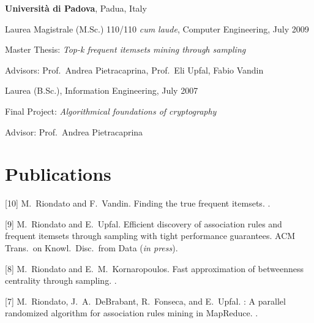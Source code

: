 \documentclass[margin,line]{resume}
\begin{document}
\begin{resume}
{\bf Universit\`a di Padova}, Padua, Italy\\
\vspace*{-.18in}
\begin{list1}
\item[] Laurea Magistrale (M.Sc.) 110/110 \textit{cum laude}, Computer Engineering, July 2009
\begin{list2}
\item Master Thesis: {\em Top-k frequent itemsets mining through sampling}
\item Advisors: Prof.~Andrea Pietracaprina, Prof.~Eli Upfal, Fabio Vandin
\end{list2}
\item[] Laurea (B.Sc.), Information Engineering, July 2007
\begin{list2}
\item Final Project: {\em Algorithmical foundations of cryptography}
\item Advisor: Prof.~Andrea Pietracaprina
\end{list2}
\end{list1}
\end{resume}
  
\section{\sc Publications}

[10] M.~Riondato and F.~Vandin.
\newblock Finding the true frequent itemsets.
.

[9] M.~Riondato and E.~Upfal.
\newblock Efficient discovery of association rules and frequent itemsets through
sampling with tight performance guarantees.
\newblock ACM Trans.~on Knowl.~Disc.~from Data (\emph{in press}).

[8] M.~Riondato and E.~M.~Kornaropoulos.
\newblock Fast approximation of betweenness centrality through sampling.
.

[7] M.~Riondato, J.~A.~DeBrabant, R.~Fonseca, and E.~Upfal.
: A parallel randomized algorithm for association rules mining
  in {MapReduce}.
.
\end{document}
